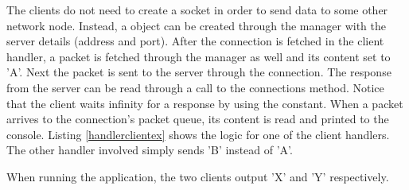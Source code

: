 The clients do not need to create a socket in order to send data to some other network node. Instead, a  object can be created through the manager with the server details (address and port). After the connection is fetched in the client handler, a packet is fetched through the manager as well and its content set to 'A'. Next the packet is sent to the server through the connection. The response from the server can be read through a call to the connections  method. Notice that the client waits infinity for a response by using the  constant. When a packet arrives to the connection's packet queue, its content is read and printed to the console. Listing \ref{handlerclientex} shows the logic for one of the client handlers. The other handler involved simply sends 'B' instead of 'A'.



When running the application, the two clients output 'X' and 'Y' respectively.